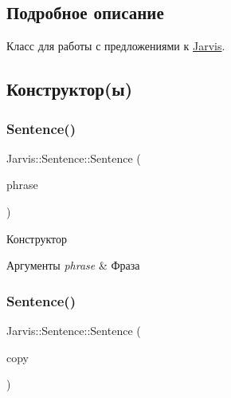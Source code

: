 \subsection{Подробное описание}
Класс для работы с предложениями к \hyperlink{classJarvis_1_1Jarvis}{Jarvis}. 

\subsection{Конструктор(ы)}
\mbox{\label{classJarvis_1_1Sentence_acc720056eaf5ae72302802c6ef694fcd}} 
\subsubsection{\texorpdfstring{Sentence()}{Sentence()}\hspace{0.1cm}{\footnotesize\ttfamily [1/3]}}
{\footnotesize\ttfamily Jarvis\+::\+Sentence\+::\+Sentence (\begin{DoxyParamCaption}\item[{const phrase \&}]{phrase }\end{DoxyParamCaption})}



Конструктор 


\begin{DoxyParams}{Аргументы}
{\em phrase} & Фраза \\
\hline
\end{DoxyParams}
\mbox{\label{classJarvis_1_1Sentence_a2cf95d90b62afeb1ba141157220b469d}} 
\subsubsection{\texorpdfstring{Sentence()}{Sentence()}\hspace{0.1cm}{\footnotesize\ttfamily [2/3]}}
{\footnotesize\ttfamily Jarvis\+::\+Sentence\+::\+Sentence (\begin{DoxyParamCaption}\item[{const \hyperlink{classJarvis_1_1Sentence}{Sentence} \&}]{copy }\end{DoxyParamCaption})}



